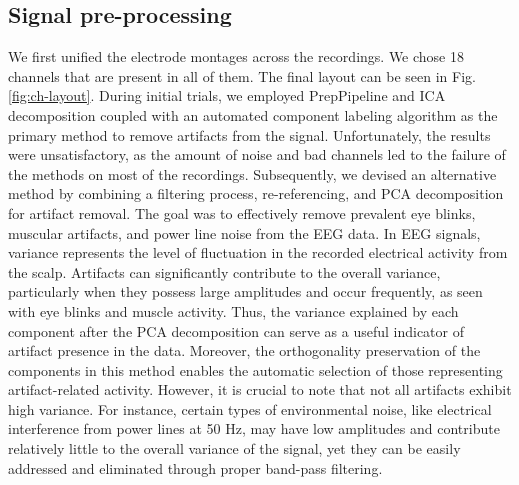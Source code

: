 \documentclass[a4paper,fleqn]{cas-sc}
\begin{document}
\subsection{Signal pre-processing}
We first unified the electrode montages across the recordings. We chose 18 channels that are present in all of them. The final layout can be seen in Fig. \ref{fig:ch-layout}.
During initial trials, we employed PrepPipeline \cite{BigdelyPrep_pipeline} and ICA decomposition coupled with an automated component labeling algorithm \cite{LiIcalabel} as the primary method to remove artifacts from the signal. Unfortunately, the results were unsatisfactory, as the amount of noise and bad channels led to the failure of the methods on most of the recordings.
Subsequently, we devised an alternative method by combining a filtering process, re-referencing, and PCA decomposition for artifact removal. 
The goal was to effectively remove prevalent eye blinks, muscular artifacts, and power line noise from the EEG data. In EEG signals, variance represents the level of fluctuation in the recorded electrical activity from the scalp. Artifacts can significantly contribute to the overall variance, particularly when they possess large amplitudes and occur frequently, as seen with eye blinks and muscle activity. Thus, the variance explained by each component after the PCA decomposition can serve as a useful indicator of artifact presence in the data. Moreover, the orthogonality preservation of the components in this method enables the automatic selection of those representing artifact-related activity. However, it is crucial to note that not all artifacts exhibit high variance. For instance, certain types of environmental noise, like electrical interference from power lines at 50 Hz, may have low amplitudes and contribute relatively little to the overall variance of the signal, yet they can be easily addressed and eliminated through proper band-pass filtering.
\end{document}
